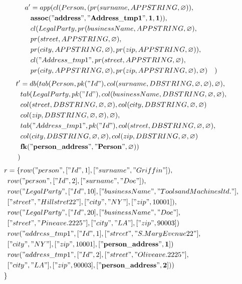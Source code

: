 \documentclass[11pt]{article}
\begin{document}
\hline
\begin{align*}
a' &= app(cl(Person, (pr(surname, APPSTRING, \varnothing)), \\ 
& \mathbf{assoc("address", "Address\_tmp1", 1, 1)}), \\ 
& cl(LegalParty, pr(businessName, APPSTRING, \varnothing), \\
& pr(street, APPSTRING, \varnothing), \\
& pr(city, APPSTRING, \varnothing), pr(zip, APPSTRING, \varnothing)), \\
& cl("Address\_tmp1", pr(street, APPSTRING, \varnothing), \\
& pr(city, APPSTRING, \varnothing), pr(zip, APPSTRING, \varnothing), \varnothing)
& )
\end{align*}
\begin{align*}
t' &=db(tab(Person, pk("Id"), col(surname, DBSTRING, \varnothing, \varnothing), \varnothing), \\
& tab(LegalParty, pk("Id"),  col(businessName, DBSTRING, \varnothing, \varnothing), \\
& col(street, DBSTRING, \varnothing, \varnothing), col(city, DBSTRING, \varnothing, \varnothing) \\
& col(zip, DBSTRING, \varnothing, \varnothing), \varnothing), \\
& tab("Address\_tmp1", pk("Id"), col(street, DBSTRING, \varnothing, \varnothing),\\
& col(city, DBSTRING, \varnothing, \varnothing), col(zip, DBSTRING, \varnothing, \varnothing) \\
& \mathbf{fk("person\_address", "Person", \varnothing)})\\
) 
\end{align*}
\begin{align*}
r &=\{ row("person", ["Id", 1], ["surname", "Griffin"]), \\
& row("person", ["Id", 2], ["surname", "Doe"]), \\
& row("LegalParty", ["Id", 10], ["businessName", "Tools and Machines ltd."], \\
& ["street", "Hill stret 22"], ["city", "NY"], ["zip", 10001]), \\
& row("LegalParty", ["Id", 20], ["businessName", "Doe"], \\
& ["street", "Pine ave. 2225"], ["city", "LA"], ["zip", 90003])\\
& row("address\_tmp1", ["Id", 1], ["street", "S. Mary Evenue 22"], \\
& ["city", "NY"], ["zip", 10001], \mathbf{["person\_address", 1]}) \\
& row("address\_tmp1", ["Id", 2], ["street", "Olive ave. 2225"], \\
& ["city", "LA"], ["zip", 90003], \mathbf{["person\_address", 2]}) )\\
\}
\end{align*}
\end{document}
